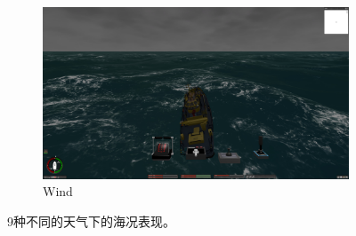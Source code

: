 \documentclass[letterpaper,10pt]{article}
\begin{document}
\begin{figure}[htbp]
\begin{subfigure}{0.3\textwidth}
						\includegraphics[width=\linewidth]{picture/Wind}
						\captionsetup{font=scriptsize}
						\caption{Wind}
						\label{fig: Wind}
					\end{subfigure}
					\captionsetup{font=scriptsize}
					\caption{
						\label{fig: Weather}
						9种不同的天气下的海况表现。
					}
				\end{figure}
			

	
	
\end{document}
